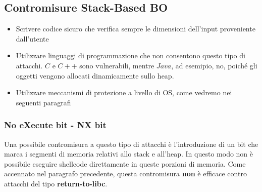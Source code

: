 \subsection{Contromisure Stack-Based BO}
\begin{itemize}
  \item Scrivere codice sicuro che verifica sempre le dimensioni dell'input proveniente dall’utente 
  \item Utilizzare linguaggi di programmazione che non consentono questo tipo di attacchi. $C$ e $C++$ sono vulnerabili, mentre $Java$, ad esemipio, no, poiché gli oggetti vengono allocati dinamicamente sullo heap.
  \item Utilizzare meccanismi di protezione a livello di OS, come vedremo nei seguenti paragrafi
\end{itemize}
\subsubsection{No eXecute bit - NX bit}
Una possibile contromisura a questo tipo di attacchi è l'introduzione di un bit che marca i segmenti di memoria relativi allo stack e all'heap. In questo modo non è possibile eseguire shellcode direttamente in queste porzioni di memoria. Come accennato nel paragrafo precedente, questa contromisura \textbf{non} è efficace contro attacchi del tipo \textbf{return-to-libc}.
